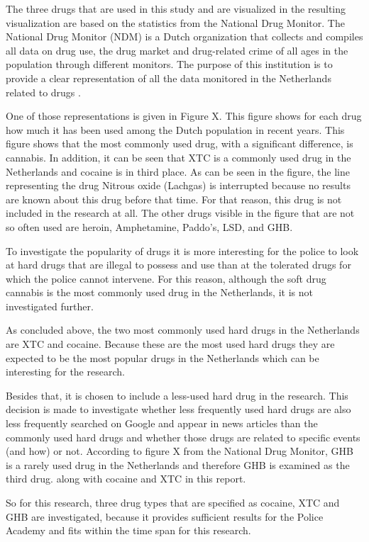 The three drugs that are used in this study and are visualized in the resulting visualization are based on the statistics from the National Drug Monitor. The National Drug Monitor (NDM) is a Dutch organization that collects and compiles all data on drug use, the drug market and drug-related crime of all ages in the population through different monitors. The purpose of this institution is to provide a clear representation of all the data monitored in the Netherlands related to drugs \cite{Trimbos}. 

One of those representations is given in Figure X. This figure shows for each drug how much it has been used among the Dutch population in recent years. This figure shows that the most commonly used drug, with a significant difference, is cannabis. In addition, it can be seen that XTC is a commonly used drug in the Netherlands and cocaine is in third place. As can be seen in the figure, the line representing the drug Nitrous oxide (Lachgas) is interrupted because no results are known about this drug before that time. For that reason, this drug is not included in the research at all. The other drugs visible in the figure that are not so often used are heroin, Amphetamine, Paddo’s, LSD, and GHB.

To investigate the popularity of drugs it is more interesting for the police to look at hard drugs that are illegal to possess and use than at the tolerated drugs for which the police cannot intervene. For this reason, although the soft drug cannabis is the most commonly used drug in the Netherlands, it is not investigated further.

As concluded above, the two most commonly used hard drugs in the Netherlands are XTC and cocaine. Because these are the most used hard drugs they are expected to be the most popular drugs in the Netherlands which can be interesting for the research. 

Besides that, it is chosen to include a less-used hard drug in the research. This decision is made to investigate whether less frequently used hard drugs are also less frequently searched on Google and appear in news articles than the commonly used hard drugs and whether those drugs are related to specific events (and how) or not. According to figure X from the National Drug Monitor, GHB is a rarely used drug in the Netherlands and therefore GHB is examined as the third drug. along with cocaine and XTC in this report. 

So for this research, three drug types that are specified as cocaine, XTC and GHB are investigated, because it provides sufficient results for the Police Academy and fits within the time span for this research. 

